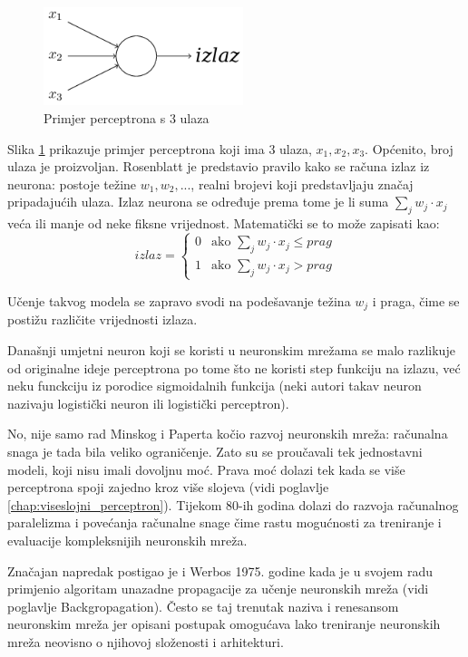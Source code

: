 \documentclass[times, utf8, diplomski, numeric]{fer}
\begin{document}
\begin{figure}[htb]
\centering
\includegraphics[width=220px]{imgs/percep.png}
\caption{Primjer perceptrona s 3 ulaza}
\label{fig:percep}
\end{figure}

Slika \ref{fig:percep} prikazuje primjer perceptrona koji ima 3 ulaza, $x_1, x_2, x_3$. Općenito, broj ulaza je proizvoljan. Rosenblatt je predstavio pravilo kako se računa izlaz iz neurona: postoje težine $w_1, w_2, ...$, realni brojevi koji predstavljaju značaj pripadajućih ulaza. Izlaz neurona se određuje prema tome je li suma $\sum_{j} w_j \cdot x_j$ veća ili manje od neke fiksne vrijednost. Matematički se to može zapisati kao:
\begin{equation}
izlaz =
\left\{
	\begin{array}{ll}
		0  & \mbox{ako } \sum_j w_j \cdot x_j \leq prag \\
		1  & \mbox{ako } \sum_j w_j \cdot x_j >  prag
	\end{array}
\right.
\end{equation}

Učenje takvog modela se zapravo svodi na podešavanje težina $w_j$ i praga, čime se postižu različite vrijednosti izlaza.

Današnji umjetni neuron koji se koristi u neuronskim mrežama se malo razlikuje od originalne ideje perceptrona po tome što ne koristi step funkciju na izlazu, već neku funckciju iz porodice sigmoidalnih funkcija (neki autori takav neuron nazivaju logistički neuron ili logistički perceptron).

No, nije samo rad Minskog i Paperta kočio razvoj neuronskih mreža: računalna snaga je tada bila veliko ograničenje. Zato su se proučavali tek jednostavni modeli, koji nisu imali dovoljnu moć. Prava moć dolazi tek kada se više perceptrona spoji zajedno kroz više slojeva (vidi poglavlje \ref{chap:viseslojni_perceptron}). Tijekom 80-ih godina dolazi do razvoja računalnog paralelizma i povećanja računalne snage čime rastu mogućnosti za treniranje i evaluacije kompleksnijih neuronskih mreža.

Značajan napredak postigao je i Werbos 1975. godine kada je u svojem radu \cite{Werbos:74} primjenio algoritam unazadne propagacije  za učenje neuronskih mreža (vidi poglavlje Backgropagation).
Često se taj trenutak naziva i renesansom neuronskim mreža jer opisani postupak omogućava lako treniranje neuronskih mreža neovisno o njihovoj složenosti i arhitekturi.
\end{document}
